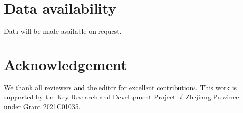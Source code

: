 \documentclass[a4paper,10pt]{article}
\begin{document}
\begin{multicols}{2}
\section*{Data availability}
Data will be made available on request.

\section*{Acknowledgement}
We thank all reviewers and the editor for excellent contributions. This work is supported by the Key Research and Development Project of Zhejiang Province under Grant 2021C01035.

\printbibliography

\end{multicols}
\end{document}
